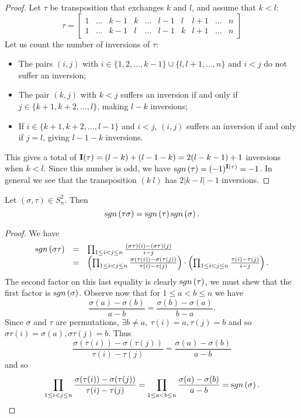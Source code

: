 \begin{proof}
Let $\tau$ be transposition that exchanges $k$ and $l$, and assume
that $k<l$:
$$
 \tau=
\begin{bmatrix}
1 & \dots & k-1 & k &  \dots & l-1 & l & l+1 & \dots & n \\
1 & \dots & k-1 & l &  \dots & l-1 & k & l+1 & \dots & n
\end{bmatrix}
$$
Let us count the number of inversions of $\tau$:
\begin{itemize}
 \item The pairs $(i,j)$ with $i\in\{1, 2, \ldots, k - 1\}\cup\{l, l + 1, \ldots, n\}$ and $i<j$
 do not suffer an inversion;
 \item The pair $(k,j)$ with $k<j$ suffers an inversion if and only if
 $j\in \{k+1, k + 2, \ldots , l\}$, making  $l-k$
inversions;
 \item If $i\in\{k+1, k + 2, \ldots , l-1\}$ and $i<j$, $(i,j)$
 suffers an
inversion if and only if $j=l$, giving $l-1-k$ inversions.
\end{itemize}
This gives a total of ${\textbf  I}(\tau)=(l-k)+(l-1-k)=2(l-k-1)+1$
inversions when $k < l$. Since this number is odd, we have
$\sgn{\tau}=(-1)^{{\textbf  I}(\tau)}=-1$. In general we see that the
transposition $(k\ l)$ has $2|k - l| - 1$ inversions.
\end{proof}
\begin{thm} \label{thm:signum_is_a_homomorphism} Let $(\sigma, \tau)\in S_n
^2$. Then
$$ \sgn{\tau\sigma} = \sgn{\tau}\sgn{\sigma}. $$
\end{thm}
\begin{proof}
We have
$$\begin{array}{lll}
\sgn{\sigma\tau} & = &  \prod_{1\leq i<j\leq n}
\frac{(\sigma\tau)(i)-(\sigma\tau)(j)}{i-j} \\ & = &
\left(\prod_{1\leq i<j\leq n}
\frac{\sigma(\tau(i))-\sigma(\tau(j))}
{\tau(i)-\tau(j)}\right)\cdot \left(\prod_{1\leq i<j\leq n}
\frac{\tau(i)-\tau(j)}{i-j}\right). \end{array}
$$
The second factor on this last equality is clearly  $\sgn{\tau}$,
we must shew that the first factor is $\sgn{\sigma}$. Observe now
that for  $1\leq a<b\leq n$ we have
$$
\frac{\sigma(a)-\sigma(b)}{a-b}=\frac{\sigma(b)-\sigma(a)}{b-a}.
$$Since
$\sigma$ and $\tau$ are permutations, $\exists b \neq a, \ \tau
(i) = a, \tau (j) = b$ and so $\sigma\tau (i) = \sigma (a),
\sigma\tau (j) = b$. Thus
$$ \frac{\sigma(\tau(i))-\sigma(\tau(j))}
{\tau(i)-\tau(j)} = \frac{\sigma (a) - \sigma (b)}{a - b} $$ and
so
$$\prod_{1\leq
i<j\leq n} \frac{\sigma(\tau(i))-\sigma(\tau(j))}
{\tau(i)-\tau(j)} = \prod_{1\leq a<b\leq n}
\frac{\sigma(a)-\sigma(b)} {a - b} = \sgn{\sigma}.$$
\end{proof}
